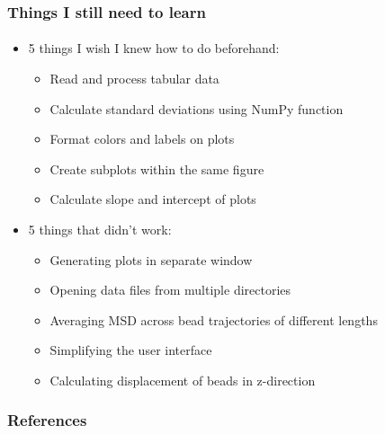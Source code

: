 \documentclass[mathserif]{beamer}
\begin{document}
    \begin{frame}
    	\frametitle{Things I still need to learn}
    	\framesubtitle{}
    	\begin{itemize}
      	\item 5 things I wish I knew how to do beforehand:
	      	\begin{itemize}
	      	\item Read and process tabular data
	      	\item Calculate standard deviations using NumPy function
	      	\item Format colors and labels on plots
	      	\item Create subplots within the same figure
	      	\item Calculate slope and intercept of plots
	      	\end{itemize}
	      	
    	\vspace{5mm}
	      	
      	\item 5 things that didn't work:
      		\begin{itemize}
      		\item Generating plots in separate window
      		\item Opening data files from multiple directories
      		\item Averaging MSD across bead trajectories of different lengths
      		\item Simplifying the user interface
      		\item Calculating displacement of beads in z-direction
      		\end{itemize}
		\end{itemize}
	\end{frame}

	\begin{frame}
	\frametitle{References}
	\nocite{Fluids}
	\nocite{Cbm}
	
	
	
	\end{frame}
\end{document}
